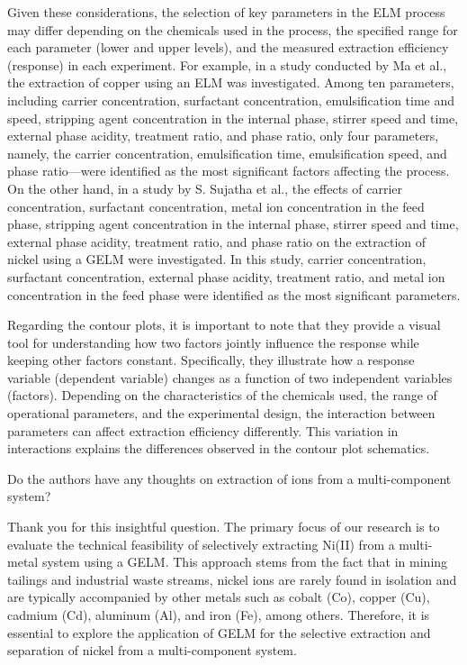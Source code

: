 \documentclass[11pt,answers]{exam}
\begin{document}
\begin{questions}
\begin{solutionorbox}[5.5cm]
Given these considerations, the selection of key parameters in the ELM process may differ depending on the chemicals used in the process, the specified range for each parameter (lower and upper levels), and the measured extraction efficiency (response) in each experiment. For example, in a study conducted by Ma et al.\cite{MA201788}, the extraction of copper using an ELM was investigated. Among ten parameters, including carrier concentration, surfactant concentration, emulsification time and speed, stripping agent concentration in the internal phase, stirrer speed and time, external phase acidity, treatment ratio, and phase ratio, only four parameters, namely, the carrier concentration, emulsification time, emulsification speed, and phase ratio—were identified as the most significant factors affecting the process. On the other hand, in a study by S. Sujatha et al.\cite{SUJATHA2021108444}, the effects of carrier concentration, surfactant concentration, metal ion concentration in the feed phase, stripping agent concentration in the internal phase, stirrer speed and time, external phase acidity, treatment ratio, and phase ratio on the extraction of nickel using a GELM were investigated. In this study, carrier concentration, surfactant concentration, external phase acidity, treatment ratio, and metal ion concentration in the feed phase were identified as the most significant parameters.

Regarding the contour plots, it is important to note that they provide a visual tool for understanding how two factors jointly influence the response while keeping other factors constant. Specifically, they illustrate how a response variable (dependent variable) changes as a function of two independent variables (factors). Depending on the characteristics of the chemicals used, the range of operational parameters, and the experimental design, the interaction between parameters can affect extraction efficiency differently. This variation in interactions explains the differences observed in the contour plot schematics.



 \end{solutionorbox}

\question Do the authors have any thoughts on extraction of ions from a multi-component system?
\begin{solutionorbox}


Thank you for this insightful question. The primary focus of our research is to evaluate the technical feasibility of selectively extracting Ni(II) from a multi-metal system using a GELM. This approach stems from the fact that in mining tailings and industrial waste streams, nickel ions are rarely found in isolation and are typically accompanied by other metals such as cobalt (Co), copper (Cu), cadmium (Cd), aluminum (Al), and iron (Fe), among others. Therefore, it is essential to explore the application of GELM for the selective extraction and separation of nickel from a multi-component system.


\end{solutionorbox}
\end{questions}
\end{document}
